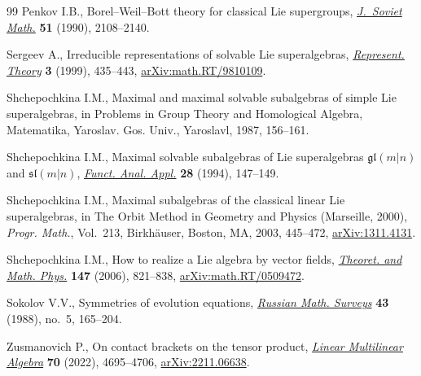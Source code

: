 \documentclass[pdftex]{sigma}
\newcommand {\<} [2] {{\left.\vphantom{#2}\right.^{#1\!}\!{#2}}}
\numberwithin{equation}{section}
\begin{document}
\begin{thebibliography}{99}
Penkov I.B., Borel--{W}eil--{B}ott theory for classical {L}ie supergroups,
 \href{https://doi.org/10.1007/BF01098186}{\textit{J.~Soviet Math.}}
 \textbf{51} (1990), 2108--2140.

Sergeev A., Irreducible representations of solvable {L}ie superalgebras,
 \href{https://doi.org/10.1090/S1088-4165-99-00086-2}{\textit{Represent.
 Theory}} \textbf{3} (1999), 435--443,
 \href{http://arxiv.org/abs/math.RT/9810109}{arXiv:math.RT/9810109}.

Shchepochkina I.M., Maximal and maximal solvable subalgebras of simple {L}ie
 superalgebras, in Problems in Group Theory and Homological Algebra,
 Matematika, Yaroslav. Gos. Univ., Yaroslavl, 1987, 156--161.

Shchepochkina I.M., Maximal solvable subalgebras of {L}ie superalgebras
 {$\mathfrak{gl}(m|n)$} and {$\mathfrak{sl}(m|n)$},
 \href{https://doi.org/10.1007/BF01076514}{\textit{Funct. Anal. Appl.}}
 \textbf{28} (1994), 147--149.

Shchepochkina I.M., Maximal subalgebras of the classical linear {L}ie
 superalgebras, in The Orbit Method in Geometry and Physics ({M}arseille,
 2000), \textit{Progr. Math.}, Vol.~213, Birkh\"auser, Boston, MA, 2003,
 445--472, \href{http://arxiv.org/abs/1311.4131}{arXiv:1311.4131}.

Shchepochkina I.M., How to realize a {L}ie algebra by vector fields,
 \href{https://doi.org/10.1007/s11232-006-0078-5}{\textit{Theoret. and Math. Phys.}} \textbf{147} (2006), 821--838,
 \href{http://arxiv.org/abs/math.RT/0509472}{arXiv:math.RT/0509472}.

Sokolov V.V., Symmetries of evolution equations,
 \href{https://doi.org/10.1070/RM1988v043n05ABEH001927}{\textit{Russian Math.
 Surveys}} \textbf{43} (1988), no.~5, 165--204.

Zusmanovich P., On contact brackets on the tensor product,
 \href{https://doi.org/10.1080/03081087.2021.1895049}{\textit{Linear
 Multilinear Algebra}} \textbf{70} (2022), 4695--4706,
 \href{http://arxiv.org/abs/2211.06638}{arXiv:2211.06638}.

\end{thebibliography}\LastPageEnding
\end{document}
